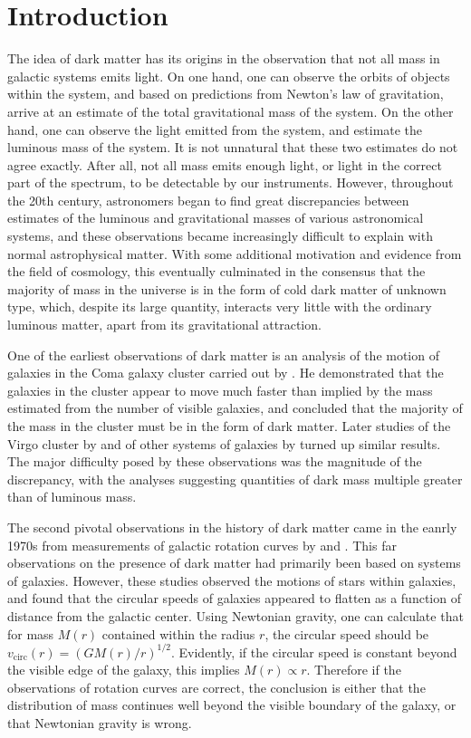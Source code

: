 \documentclass[b5paper, 10pt, twoside]{book}
\begin{document}
\cleardoublepage
\mainmatter

\chapter{Introduction}

The idea of dark matter has its origins in the observation that not all mass in galactic systems emits light. On one hand, one can observe the orbits of objects within the system, and based on predictions from Newton's law of gravitation, arrive at an estimate of the total gravitational mass of the system. On the other hand, one can observe the light emitted from the system, and estimate the luminous mass of the system. It is not unnatural that these two estimates do not agree exactly. After all, not all mass emits enough light, or light in the correct part of the spectrum, to be detectable by our instruments. However, throughout the 20th century, astronomers began to find great discrepancies between estimates of the luminous and gravitational masses of various astronomical systems, and these observations became increasingly difficult to explain with normal astrophysical matter. With some additional motivation and evidence from the field of cosmology, this eventually culminated in the consensus that the majority of mass in the universe is in the form of cold dark matter of unknown type, which, despite its large quantity, interacts very little with the ordinary luminous matter, apart from its gravitational attraction.

One of the earliest observations of dark matter is an analysis of the motion of galaxies in the Coma galaxy cluster carried out by \textcite{Zwicky1933}. He demonstrated that the galaxies in the cluster appear to move much faster than implied by the mass estimated from the number of visible galaxies, and concluded that the majority of the mass in the cluster must be in the form of dark matter. Later studies of the Virgo cluster by \textcite{Smith1936} and of other systems of galaxies by \textcite{Holmberg1937} turned up similar results. The major difficulty posed by these observations was the magnitude of the discrepancy, with the analyses suggesting quantities of dark mass multiple greater than of luminous mass.

The second pivotal observations in the history of dark matter came in the eanrly 1970s from measurements of galactic rotation curves by \textcite{RubinFord1970} and \textcite{Freeman1970}. This far observations on the presence of dark matter had primarily been based on systems of galaxies. However, these studies observed the motions of stars within galaxies, and found that the circular speeds of galaxies appeared to flatten as a function of distance from the galactic center. Using Newtonian gravity, one can calculate that for mass $M(r)$ contained within the radius $r$, the circular speed should be $v_\text{circ}(r)=(GM(r)/r)^{1/2}$. Evidently, if the circular speed is constant beyond the visible edge of the galaxy, this implies $M(r)\propto r$. Therefore if the observations of rotation curves are correct, the conclusion is either that the distribution of mass continues well beyond the visible boundary of the galaxy, or that Newtonian gravity is wrong.
\end{document}
